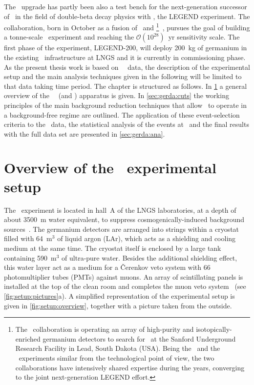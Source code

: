 \newpar
The \phasetwop\ upgrade has partly been also a test bench for the next-generation successor of
\gerda\ in the field of double-beta decay physics with \gesix, the LEGEND experiment. The
collaboration, born in October  as a fusion of \gerda\ and
\majorana\footnote{%
  The \majorana\ collaboration is operating an array of high-purity and
  isotopically-enriched germanium detectors to search for \onbb\ at the Sanford
  Underground Research Facility in Lead, South Dakota (USA). Being the \majoranademo\ and
  the \gerda\ experiments similar from the technological point of view, the two
  collaborations have intensively shared expertise during the years, converging to the
  joint next-generation LEGEND effort.
}~\cite{Abgrall2014}, pursues the goal of building a tonne-scale \gesix\ experiment and
reaching the $\mathcal{O}(10^{28})$~yr sensitivity scale. The first phase of the
experiment, LEGEND-200, will deploy 200~kg of germanium in the existing \gerda\
infrastructure at LNGS and it is currently in commissioning phase.
\newpar
As the present thesis work is based on \gerda\ \phasetwo\ data, the description of the
experimental setup and the main analysis techniques given in the following will be limited
to that data taking time period. The chapter is structured as follows. In
\cref{sec:gerda:setup} a general overview of the \gerda\ \phasetwo\ (and \phasetwop)
apparatus is given. In \cref{sec:gerda:cuts} the working principles of the main background
reduction techniques that allow \gerda\ to operate in a background-free regime are
outlined. The application of these event-selection criteria to the \phasetwo\ data, the
statistical analysis of the events at \qbb\ and the final results with the full data set
are presented in \cref{sec:gerda:ana}.

\section{Overview of the \phasetwo\ experimental setup}%
\label{sec:gerda:setup}

The \gerda\ experiment is located in hall~A of the LNGS laboratories, at a depth of about
3500~m water equivalent, to suppress cosmogenically-induced background
sources~\cite{Wiesinger2018}. The germanium detectors are arranged into strings within a
cryostat filled with 64~m$^3$ of liquid argon (LAr), which acts as a shielding and cooling
medium at the same time. The cryostat itself is enclosed by a large tank containing
590~m$^3$ of ultra-pure water.  Besides the additional shielding effect, this water layer
act as a medium for a \v{C}erenkov veto system with 66 photomultiplier tubes (PMTs)
against muons. An array of scintillating panels is installed at the top of the clean room
and completes the muon veto system~\cite{Freund2016} (see \cref{fig:setup:pictures}a). A
simplified representation of the experimental setup is given in \cref{fig:setup:overview},
together with a picture taken from the outside.

